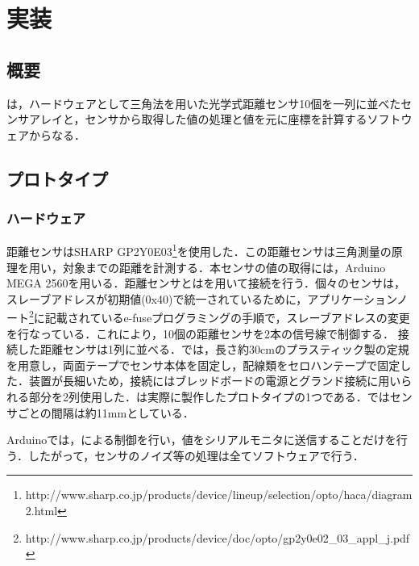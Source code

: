 \chapter{実装}
\section{概要}
\SysName は，ハードウェアとして三角法を用いた光学式距離センサ10個を一列に並べたセンサアレイと，センサから取得した値の処理と値を元に座標を計算するソフトウェアからなる．
\section{プロトタイプ} 
\subsection{ハードウェア}
距離センサはSHARP GP2Y0E03\footnote{http://www.sharp.co.jp/products/device/lineup/selection/opto/haca/diagram2.html}を使用した．この距離センサは三角測量の原理を用い，対象までの距離を計測する．本センサの値の取得には，Arduino MEGA 2560を用いる．距離センサとは\iic を用いて接続を行う．個々のセンサは，スレーブアドレスが初期値(0x40)で統一されているために，アプリケーションノート\footnote{http://www.sharp.co.jp/products/device/doc/opto/gp2y0e02\_03\_appl\_j.pdf}に記載されているe-fuseプログラミングの手順で，スレーブアドレスの変更を行なっている．これにより，10個の距離センサを2本の信号線で制御する．
接続した距離センサは1列に並べる．\SysName では，長さ約30\si{cm}のプラスティック製の定規を用意し，両面テープでセンサ本体を固定し，配線類をセロハンテープで固定した．装置が長細いため，接続にはブレッドボードの電源とグランド接続に用いられる部分を2列使用した．は実際に製作したプロトタイプの1つである．ではセンサごとの間隔は約11\si{mm}としている．

Arduinoでは，\iic による制御を行い，値をシリアルモニタに送信することだけを行う．したがって，センサのノイズ等の処理は全てソフトウェアで行う．
